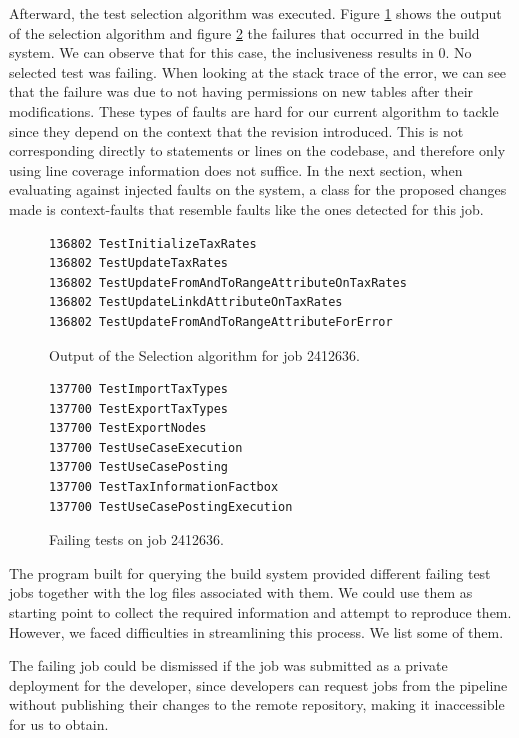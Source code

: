 \documentclass{article}
\begin{document}
Afterward, the test selection algorithm was executed. Figure \ref{fig:evalalgout} shows the output of the selection algorithm and figure \ref{fig:evalfailures} the failures that occurred in the build system. We can observe that for this case, the inclusiveness results in 0. No selected test was failing. When looking at the stack trace of the error, we can see that the failure was due to not having permissions on new tables after their modifications. These types of faults are hard for our current algorithm to tackle since they depend on the context that the revision introduced. This is not corresponding directly to statements or lines on the codebase, and therefore only using line coverage information does not suffice. In the next section, when evaluating against injected faults on the system, a class for the proposed changes made is context-faults that resemble faults like the ones detected for this job.


\begin{figure}[H]
\begin{verbatim}
136802 TestInitializeTaxRates
136802 TestUpdateTaxRates
136802 TestUpdateFromAndToRangeAttributeOnTaxRates
136802 TestUpdateLinkdAttributeOnTaxRates
136802 TestUpdateFromAndToRangeAttributeForError 
\end{verbatim}
\caption{Output of the Selection algorithm for job 2412636.}
\label{fig:evalalgout}
\end{figure}

\begin{figure}[H]
\begin{verbatim}
137700 TestImportTaxTypes
137700 TestExportTaxTypes
137700 TestExportNodes
137700 TestUseCaseExecution
137700 TestUseCasePosting
137700 TestTaxInformationFactbox
137700 TestUseCasePostingExecution
\end{verbatim}
\caption{Failing tests on job 2412636.}
\label{fig:evalfailures}
\end{figure}

The program built for querying the build system provided different failing test jobs together with the log files associated with them. We could use them as starting point to collect the required information and attempt to reproduce them. However, we faced difficulties in streamlining this process. We list some of them.

The failing job could be dismissed if the job was submitted as a private deployment for the developer, since developers can request jobs from the pipeline without publishing their changes to the remote repository, making it inaccessible for us to obtain.
\end{document}
